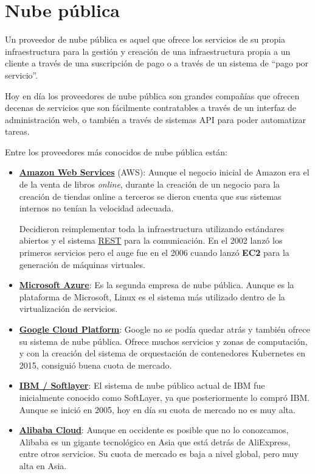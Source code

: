 \section{Nube pública}

Un proveedor de nube pública es aquel que ofrece los servicios de su propia infraestructura para la gestión y creación de una infraestructura propia a un cliente a través de una suscripción de pago o a través de un sistema de “pago por servicio”.

Hoy en día los proveedores de nube pública son grandes compañías que ofrecen decenas de servicios que son fácilmente contratables a través de un interfaz de administración web, o también a través de sistemas API para poder automatizar tareas.

Entre los proveedores más conocidos de nube pública están:

\begin{itemize}
	\item \textbf{\href{https://aws.amazon.com/es/}{Amazon Web Services}} (AWS): Aunque el negocio inicial de Amazon era el de la venta de libros \textit{online}, durante la creación de un negocio para la creación de tiendas online a terceros se dieron cuenta que sus sistemas internos no tenían la velocidad adecuada.
	
	Decidieron reimplementar toda la infraestructura utilizando estándares abiertos y el sistema \href{https://en.wikipedia.org/wiki/REST}{REST} para la comunicación. En el 2002 lanzó los primeros servicios pero el auge fue en el 2006 cuando lanzó \textbf{EC2} para la generación de máquinas virtuales.
	
	\item \textbf{\href{https://azure.microsoft.com/es-es/}{Microsoft Azure}}: Es la segunda empresa de nube pública. Aunque es la plataforma de Microsoft, Linux es el sistema más utilizado dentro de la virtualización de servicios.
	
	\item \textbf{\href{https://cloud.google.com/}{Google Cloud Platform}}: Google no se podía quedar atrás y también ofrece su sistema de nube pública. Ofrece muchos servicios y zonas de computación, y con la creación del sistema de orquestación de contenedores Kubernetes en 2015, consiguió buena cuota de mercado.
	
	\item \textbf{\href{https://www.ibm.com/cloud}{IBM / Softlayer}}: El sistema de nube público actual de IBM fue inicialmente conocido como SoftLayer, ya que posteriormente lo compró IBM. Aunque se inició en 2005, hoy en día su cuota de mercado no es muy alta.
	
	\item \textbf{\href{https://www.alibabacloud.com/}{Alibaba Cloud}}: Aunque en occidente es posible que no lo conozcamos, Alibaba es un gigante tecnológico en Asia que está detrás de AliExpress, entre otros servicios.  Su cuota de mercado es baja a nivel global, pero muy alta en Asia.
	
\end{itemize}